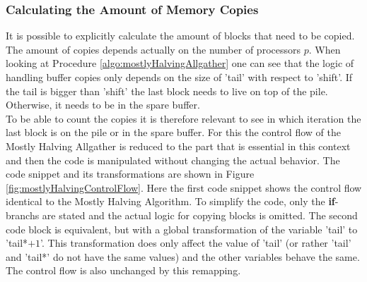 \subsubsection{Calculating the Amount of Memory Copies} \label{sec:AllgatherShiftNumberOfCopies}
It is possible to explicitly calculate the amount of blocks that need to be copied. The amount of copies depends actually on the number of processors $p$. When looking at Procedure \ref{algo:mostlyHalvingAllgather} one can see that the logic of handling buffer copies only depends on the size of 'tail' with respect to 'shift'. If the tail is bigger than 'shift' the last block needs to live on top of the pile. Otherwise, it needs to be in the spare buffer. \\
To be able to count the copies it is therefore relevant to see in which iteration the last block is on the pile or in the spare buffer. For this the control flow of the Mostly Halving Allgather is reduced to the part that is essential in this context and then the code is manipulated without changing the actual behavior. The code snippet and its transformations are shown in Figure \ref{fig:mostlyHalvingControlFlow}. Here the first code snippet shows the control flow identical to the Mostly Halving Algorithm. To simplify the code, only the \textbf{if}-branchs are stated and the actual logic  for copying blocks is omitted. The second code block is equivalent, but with a global transformation of the variable 'tail' to 'tail*$+1$'. This transformation does only affect the value of 'tail' (or rather 'tail' and 'tail*' do not have the same values) and the other variables behave the same. The control flow is also unchanged by this remapping.   
